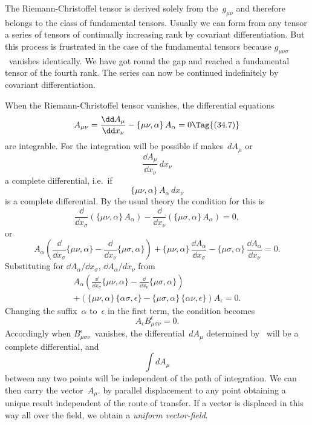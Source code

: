 \documentclass[12pt]{book}
\begin{document}
The Riemann-Christoffel tensor is derived solely from the~$g_{\mu\nu}$ and therefore
belongs to the class of fundamental tensors. Usually we can form from
any tensor a series of tensors of continually increasing rank by covariant
differentiation. But this process is frustrated in the case of the fundamental
tensors because $g_{\mu\nu\sigma}$~vanishes identically. We have got round the gap and
reached a fundamental tensor of the fourth rank. The series can now be continued
indefinitely by covariant differentiation.

When the Riemann-Christoffel tensor vanishes, the differential equations
%
%
\[
A_{\mu\nu} = \frac{\dd A_{\mu}}{\dd x_{\nu}} - \{\mu\nu, \alpha\}\, A_{\alpha} = 0
\Tag{(34.7)}
\]
are integrable. For the integration will be possible if  makes~$dA_{\mu}$ or
\[
\frac{\dd A_{\mu}}{\dd x_{\nu}}\, dx_{\nu}
\]
a complete differential, i.e.\ if
\[
\{\mu\nu, \alpha\}\, A_{\alpha}\, dx_{\nu}
\]
is a complete differential. By the usual theory the condition for this is
\[
\frac{\dd}{\dd x_{\sigma}} (\{\mu\nu, \alpha\}\, A_{\alpha})
- \frac{\dd}{\dd x_{\nu}} (\{\mu\sigma, \alpha\}\, A_{\alpha}) = 0,
\]
or
\[
A_{\alpha} \left(\frac{\dd}{\dd x_{\sigma}} \{\mu\nu, \alpha\}
             - \frac{\dd}{\dd x_{\nu}} \{\mu\sigma, \alpha\}\right)
+ \{\mu\nu, \alpha\}\, \frac{\dd A_{\alpha}}{\dd x_{\sigma}}
- \{\mu\sigma, \alpha\}\, \frac{\dd A_{\alpha}}{\dd x_{\nu}} = 0.
\]
Substituting for $\dd A_{\alpha}/\dd x_{\sigma}$, $\dd A_{\alpha}/dx_{\nu}$ from~
\begin{multline*}
A_{\alpha} \left(\frac{\dd}{\dd x_{\sigma}} \{\mu\nu, \alpha\}
             - \frac{\dd}{\dd x_{\nu}} \{\mu\sigma, \alpha\}\right) \\
+ (\{\mu\nu, \alpha\}\, \{\alpha\sigma, \epsilon\}
- \{\mu\sigma, \alpha\}\, \{\alpha\nu, \epsilon\}) A_{\epsilon} = 0.
\end{multline*}
Changing the suffix~$\alpha$ to~$\epsilon$ in the first term, the condition becomes
\[
A_{\epsilon} B_{\mu\sigma\nu}^{\epsilon} = 0.
\]
Accordingly when $B_{\mu\sigma\nu}^{\epsilon}$~vanishes, the differential~$dA_{\mu}$ determined by~
will be a complete differential, and
\[
\int dA_{\mu}
\]
between any two points will be independent of the path of integration. We
can then carry the vector~$A_{\mu}$. by parallel displacement to any point obtaining
a unique result independent of the route of transfer. If a vector is displaced
in this way all over the field, we obtain a \emph{uniform vector-field}.
%
\end{document}
